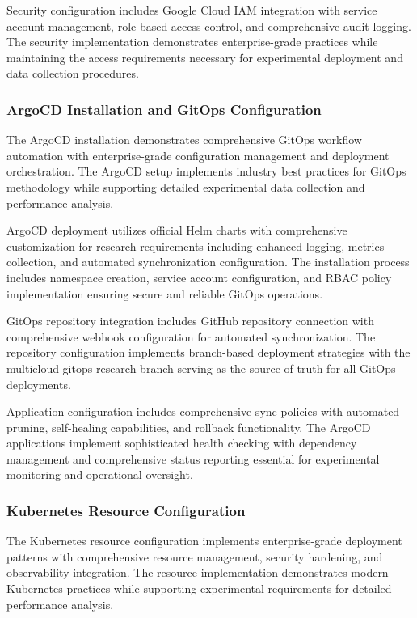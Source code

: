 Security configuration includes Google Cloud IAM integration with service account management, role-based access control, and comprehensive audit logging. The security implementation demonstrates enterprise-grade practices while maintaining the access requirements necessary for experimental deployment and data collection procedures.

\subsubsection{ArgoCD Installation and GitOps Configuration}

The ArgoCD installation demonstrates comprehensive GitOps workflow automation with enterprise-grade configuration management and deployment orchestration. The ArgoCD setup implements industry best practices for GitOps methodology while supporting detailed experimental data collection and performance analysis.

ArgoCD deployment utilizes official Helm charts with comprehensive customization for research requirements including enhanced logging, metrics collection, and automated synchronization configuration. The installation process includes namespace creation, service account configuration, and RBAC policy implementation ensuring secure and reliable GitOps operations.

GitOps repository integration includes GitHub repository connection with comprehensive webhook configuration for automated synchronization. The repository configuration implements branch-based deployment strategies with the multicloud-gitops-research branch serving as the source of truth for all GitOps deployments.

Application configuration includes comprehensive sync policies with automated pruning, self-healing capabilities, and rollback functionality. The ArgoCD applications implement sophisticated health checking with dependency management and comprehensive status reporting essential for experimental monitoring and operational oversight.

\subsubsection{Kubernetes Resource Configuration}

The Kubernetes resource configuration implements enterprise-grade deployment patterns with comprehensive resource management, security hardening, and observability integration. The resource implementation demonstrates modern Kubernetes practices while supporting experimental requirements for detailed performance analysis.

